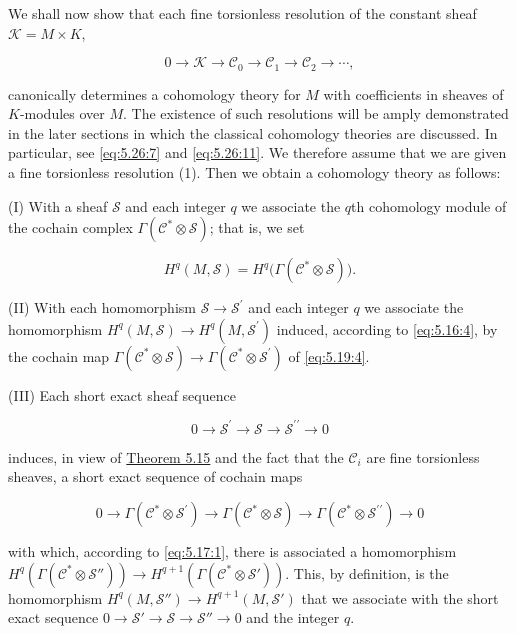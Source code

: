 \label{thm:5.20} We shall now show that each fine torsionless resolution of the constant sheaf  $ \mathcal{K} = M \times K $,

\begin{equation}
\tag{1}\label{eq:5.20:1}
0\to\mathcal{K}\to\mathcal{C}_{0}\to\mathcal{C}_{1}\to\mathcal{C}_{2}\to\cdots,
\end{equation}

canonically determines a cohomology theory for $M$ with coefficients in sheaves of $K$-modules over $M$. The existence of such resolutions will be amply demonstrated in the later sections in which the classical cohomology theories are discussed. In particular, see \eqref{eq:5.26:7} and \eqref{eq:5.26:11}. We therefore assume that we are given a fine torsionless resolution (1). Then we obtain a cohomology theory as follows: 

(I) With a sheaf $\mathcal{S}$ and each integer $q$ we associate the $q$th cohomology module of the cochain complex  $ \Gamma(\mathcal{C}^* \otimes \mathcal{S}) $; that is, we set

\[
H^{q}(M,\mathcal{S})=H^{q}\big(\Gamma(\mathcal{C}^{\ast}\otimes\mathcal{S})\big).
\]

(II) With each homomorphism $\mathcal{S}\to\mathcal{S}^{\prime}$ and each integer $q$ we associate the homomorphism $H^{q}(M,\mathcal{S})\to H^{q}(M,\mathcal{S}^{\prime})$ induced, according to \eqref{eq:5.16:4}, by the cochain map $\Gamma(\mathcal{C}^{*}\otimes\mathcal{S})\to\Gamma(\mathcal{C}^{*}\otimes\mathcal{S}^{\prime})$ of \eqref{eq:5.19:4}.

(III) Each short exact sheaf sequence

\[
0\to\mathcal{S}^{\prime}\to\mathcal{S}\to\mathcal{S}^{\prime \prime}\to0
\]

induces, in view of \hyperref[thm:5.15]{Theorem 5.15} and the fact that the $\mathcal{C}_{i}$ are fine torsionless sheaves, a short exact sequence of cochain maps

\[
0\to\Gamma(\mathcal{C}^{*}\otimes\mathcal{S}^{\prime})\to\Gamma(\mathcal{C}^{*}\otimes\mathcal{S})\to\Gamma(\mathcal{C}^{*}\otimes\mathcal{S}^{\prime\prime})\to0
\]

with which, according to \eqref{eq:5.17:1}, there is associated a homomorphism  $ H^{q}(\Gamma(\mathcal{C}^*\otimes\mathcal{S}''))\to H^{q+1}(\Gamma(\mathcal{C}^*\otimes\mathcal{S}')) $. This, by definition, is the homomorphism $H^{q}(M,\mathcal{S}'') \to H^{q+1}(M,\mathcal{S}')$ that we associate with the short exact sequence $0 \to \mathcal{S}' \to \mathcal{S} \to \mathcal{S}'' \to 0$ and the integer  $ q $.

